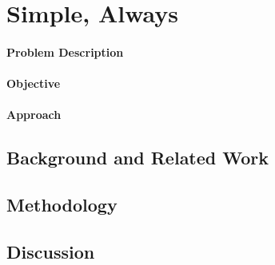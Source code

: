 \documentclass[a4paper]{article}
\begin{document}

\section{Simple, Always} %
\label{sec:SimpleAlways}

\paragraph{Problem Description} %
\label{sec:SimpleAlways_problem}


\paragraph{Objective} %
\label{sec:SimpleAlways_objective}


\paragraph{Approach} %
\label{sec:SimpleAlways_approach}


\subsection{Background and Related Work} %
\label{sec:SimpleAlways_background}


\subsection{Methodology} %
\label{sec:SimpleAlways_methodology}


\subsection{Discussion} %
\label{sec:SimpleAlways_discussion}
\end{document}
